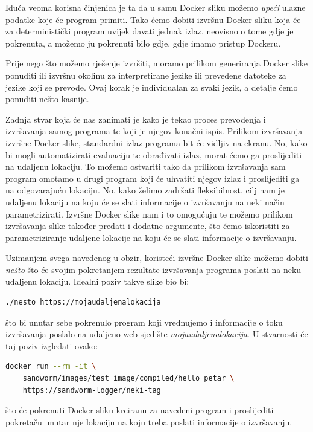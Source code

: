 \documentclass[times, utf8, zavrsni]{fer}
\begin{document}
Iduća veoma korisna činjenica je ta da u samu Docker sliku možemo \textit{upeći} ulazne podatke koje će program primiti. Tako ćemo dobiti izvršnu Docker sliku koja će za deterministički program uvijek davati jednak izlaz, neovisno o tome gdje je pokrenuta, a možemo ju pokrenuti bilo gdje, gdje imamo pristup Dockeru.

Prije nego što možemo rješenje izvršiti, moramo prilikom generiranja Docker slike ponuditi ili izvršnu okolinu za interpretirane jezike ili prevedene datoteke za jezike koji se prevode. Ovaj korak je individualan za svaki jezik, a detalje ćemo ponuditi nešto kasnije.

Zadnja stvar koja će nas zanimati je kako je tekao proces prevođenja i izvršavanja samog programa te koji je njegov konačni ispis. Prilikom izvršavanja izvršne Docker slike, standardni izlaz programa bit će vidljiv na ekranu. No, kako bi mogli automatizirati evaluaciju te obrađivati izlaz, morat ćemo ga proslijediti na udaljenu lokaciju. To možemo ostvariti tako da prilikom izvršavanja sam program omotamo u drugi program koji će uhvatiti njegov izlaz i proslijediti ga na odgovarajuću lokaciju. No, kako želimo zadržati fleksibilnost, cilj nam je udaljenu lokaciju na koju će se slati informacije o izvršavanju na neki način parametrizirati. Izvršne Docker slike nam i to omogućuju te možemo prilikom izvršavanja slike također predati i dodatne argumente, što ćemo iskoristiti za parametriziranje udaljene lokacije na koju će se slati informacije o izvršavanju.

Uzimanjem svega navedenog u obzir, koristeći izvršne Docker slike možemo dobiti \textit{nešto} što će svojim pokretanjem rezultate izvršavanja programa poslati na neku udaljenu lokaciju. Idealni poziv takve slike bio bi:

\begin{lstlisting}
./nesto https://mojaudaljenalokacija
\end{lstlisting}

što bi unutar sebe pokrenulo program koji vrednujemo i informacije o toku izvršavanja poslalo na udaljeno web sjedište {\textit{mojaudaljenalokacija}}. U stvarnosti će taj poziv izgledati ovako:

\begin{lstlisting}[language=Bash]
docker run --rm -it \
	sandworm/images/test_image/compiled/hello_petar \
	https://sandworm-logger/neki-tag
\end{lstlisting}

što će pokrenuti Docker sliku kreiranu za navedeni program i proslijediti pokretaču unutar nje lokaciju na koju treba poslati informacije o izvršavanju.
\end{document}
